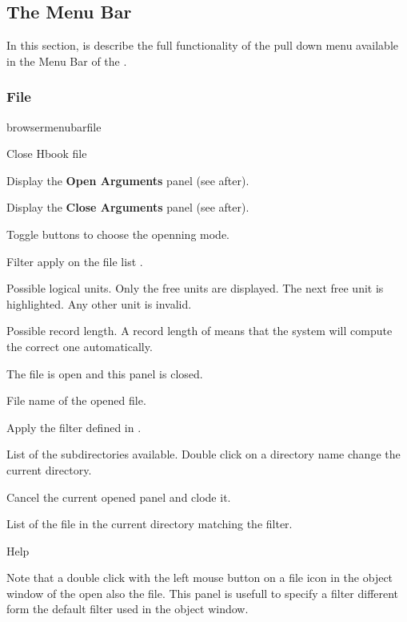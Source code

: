 \subsection{The \MB{} Menu Bar}
In this section, is describe the full functionality of the pull down
menu available in the Menu Bar of the \MB.


\subsubsection{File}

\begin{PAWf}[.25]{browsermenubarfile}
\begin{DLsf}{Close Hbook file}
\item[Open Hbook file]      Display the {\bf Open Arguments} panel (see after).
\item[Close Hbook file]     Display the {\bf Close Arguments} panel (see after).
\end{DLsf}
\end{PAWf}

\newpage


\begin{EnumZW}
\item Toggle buttons to choose the openning mode.
\item Filter apply on the file list .
\item Possible logical units. Only the free units are displayed.
      The next free unit is highlighted. Any other unit is invalid. 
\item Possible record length. A record length of  means that the
      system will compute the correct one automatically.
\end{EnumZW}
\begin{EnumZB}
\item The file is open and this panel is closed.
\item File name of the opened file.
\item Apply the filter defined in .
\item List of the subdirectories available. Double click
      on a directory name change the current directory.
\item Cancel the current opened panel and clode it.
\item List of the file in the current directory matching
      the filter.
\item Help
\end{EnumZB}
Note that a double click with the left mouse button on a
\HBOOK{} file icon in the object window of the \MB{} open also 
the \HBOOK{} file.
This panel is usefull to specify a filter different form
the default filter  used in the object window.

